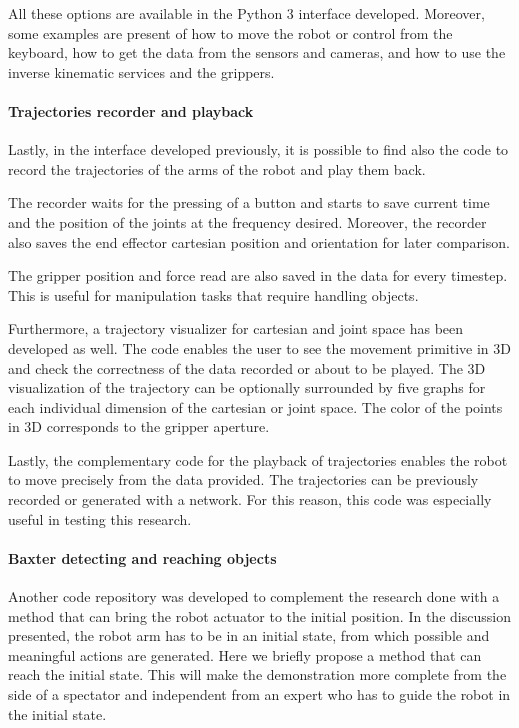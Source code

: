 All these options are available in the Python 3 interface developed. Moreover, some examples are present of how to move the robot or control from the keyboard, how to get the data from the sensors and cameras, and how to use the inverse kinematic services and the grippers. 

\paragraph{Trajectories recorder and playback} Lastly, in the interface developed previously, it is possible to find also the code to record the trajectories of the arms of the robot and play them back. 

The recorder waits for the pressing of a button and starts to save current time and the position of the joints at the frequency desired. Moreover, the recorder also saves the end effector cartesian position and orientation for later comparison. 

The gripper position and force read are also saved in the data for every timestep. This is useful for manipulation tasks that require handling objects. 

Furthermore, a trajectory visualizer for cartesian and joint space has been developed as well. The code enables the user to see the movement primitive in 3D and check the correctness of the data recorded or about to be played. The 3D visualization of the trajectory can be optionally surrounded by five graphs for each individual dimension of the cartesian or joint space. The color of the points in 3D corresponds to the gripper aperture. 

Lastly, the complementary code for the playback of trajectories enables the robot to move precisely from the data provided. The trajectories can be previously recorded or generated with a network. For this reason, this code was especially useful in testing this research. 

\paragraph{Baxter detecting and reaching objects} 
Another code repository was developed to complement the research done with a method that can bring the robot actuator to the initial position. In the discussion presented, the robot arm has to be in an initial state, from which possible and meaningful actions are generated. Here we briefly propose a method that can reach the initial state. This will make the demonstration more complete from the side of a spectator and independent from an expert who has to guide the robot in the initial state.

